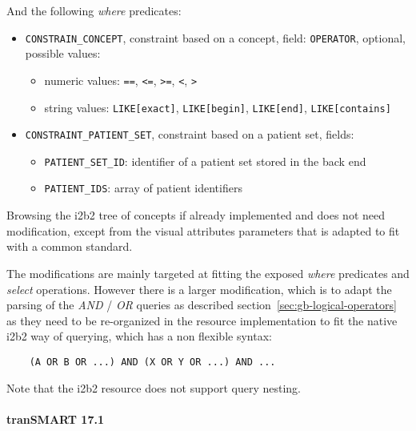 And the following \emph{where} predicates:
\begin{itemize}
    \item \verb|CONSTRAIN_CONCEPT|, constraint based on a concept, field:
    \verb|OPERATOR|, optional, possible values:
    \begin{itemize}
        \item numeric values: \verb|==|, \verb|<=|, \verb|>=|, \verb|<|, \verb|>|
        \item string values: \verb|LIKE[exact]|, \verb|LIKE[begin]|, \verb|LIKE[end]|, \verb|LIKE[contains]|
    \end{itemize}
    
    \item \verb|CONSTRAINT_PATIENT_SET|, constraint based on a patient set, fields:
    \begin{itemize}
        \item \verb|PATIENT_SET_ID|: identifier of a patient set stored in the back end
        \item \verb|PATIENT_IDS|: array of patient identifiers
    \end{itemize}
\end{itemize}

Browsing the i2b2 tree of concepts if already implemented and does not need modification, except from the visual attributes parameters that is adapted to fit with a common standard.

The modifications are mainly targeted at fitting the exposed \emph{where} predicates and \emph{select} operations.
However there is a larger modification, which is to adapt the parsing of the \emph{AND} / \emph{OR} queries as described section~\ref{sec:gb-logical-operators} as they need to be re-organized in the resource implementation to fit the native i2b2 way of querying, which has a non flexible syntax:
\begin{verbatim}
    (A OR B OR ...) AND (X OR Y OR ...) AND ...
\end{verbatim}
Note that the i2b2 resource does not support query nesting.


\paragraph{tranSMART 17.1}
\label{sec:irct-res-transmart-17.1}

